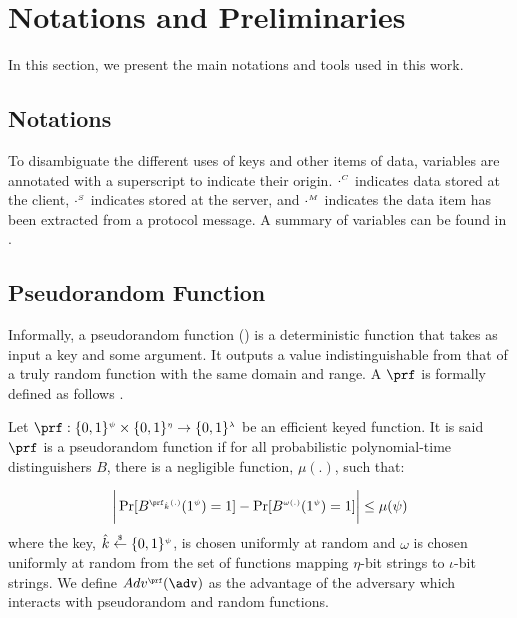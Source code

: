 




\vspace{-3mm}

\section{Notations and Preliminaries}
 In this section, we present the main notations and tools used in this work. 
 \vspace{-3mm}
 \subsection{Notations}
 
 To disambiguate the different uses of keys and other items of data, variables are annotated with a superscript to indicate their origin. $\cdot^{\scriptscriptstyle C}$ indicates data stored at the client, $\cdot^{\scriptscriptstyle S}$ indicates stored at the server, and $\cdot^{\scriptscriptstyle M}$ indicates the data item has been extracted from a protocol message. A summary of variables can be found in .
 
 
 
 

 \vspace{-3mm}
\subsection{Pseudorandom Function}\label{subsec:PRF}

Informally, a pseudorandom function (\prf) is a deterministic function that takes as input a key and some argument. It outputs a value  indistinguishable from that of a truly random function with the same domain and range.   A $\prf$ is formally defined as follows \cite{KatzLindell2014}. 
\begin{definition} Let $\prf:\{0,1\}^{\sss\psi}\times \{0,1\}^{\sss \eta}\rightarrow \{0,1\}^{\sss  \lambda}$ be an efficient  keyed function. It is said $\prf$ is a pseudorandom function if for all probabilistic polynomial-time distinguishers $B$, there is a negligible function, $\mu(.)$, such that:

\begin{equation*}
\bigg | \Pr[B^{\sss \prf_{\hat{k}}(.)}(1^{\sss \psi})=1]- \Pr[B^{\sss \omega(.)}(1^{\sss \psi})=1] \bigg |\leq\mu(\psi)
\end{equation*}
%
where  the key, $\hat{k}\stackrel{\scriptscriptstyle\$}\leftarrow\{0,1\}^{\scriptscriptstyle\psi}$, is chosen uniformly at random and $\omega$ is chosen uniformly at random from the set of functions mapping $\eta$-bit strings to $\iota$-bit strings. We define $Adv^{\sss\prf}(\adv)$ as the advantage of the adversary which interacts with pseudorandom and random functions. 

\end{definition}


